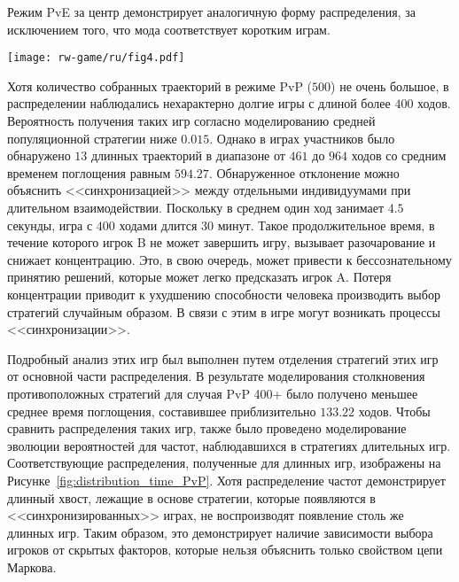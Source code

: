 Режим PvE за центр демонстрирует аналогичную форму распределения, за исключением того, что мода соответствует коротким играм.


\begin{figure*}[t]
    \centering
    \texttt{[image: rw-game/ru/fig4.pdf]}
    \caption{
        Распределение времени поглощения для режима PvP (желтая гистограмма и фиолетовая линия) по сравнению с моделированием частот направлений движения (зеленая линия) и частот стратегий (синяя линия), наблюдаемых в длительных играх (более $400$ ходов). Частоты направлений движения для каждого состояния, полученные в экспериментальных длинных играх, использовались для моделирования эволюции вероятностей найти фишку в узлах решетки. Стратегии обоих игроков A и B в PvP с длиной ходов более $400$ использовались отдельно при моделировании
    }  
    \label{fig:distribution_time_PvP}

\end{figure*}

Хотя количество собранных траекторий в режиме PvP ($500$) не очень большое, в распределении наблюдались нехарактерно долгие игры с длиной более $400$ ходов. Вероятность получения таких игр согласно моделированию средней популяционной стратегии ниже $0.015$. Однако в играх участников было обнаружено $13$ длинных траекторий в диапазоне от $461$ до $964$ ходов со средним временем поглощения равным $594.27$. Обнаруженное отклонение можно объяснить <<синхронизацией>> между отдельными индивидуумами при длительном взаимодействии. Поскольку в среднем один ход занимает $4.5$ секунды, игра с $400$ ходами длится $30$ минут. Такое продолжительное время, в течение которого игрок B не может завершить игру, вызывает разочарование и снижает концентрацию. Это, в свою очередь, может привести к бессознательному принятию решений, которые может легко предсказать игрок A. Потеря концентрации приводит к ухудшению способности человека производить выбор стратегий случайным образом. В связи с этим в игре могут возникать процессы <<синхронизации>>.

Подробный анализ этих игр был выполнен путем отделения стратегий этих игр от основной части распределения. В результате моделирования столкновения противоположных стратегий для случая PvP 400+ было получено меньшее среднее время поглощения, составившее приблизительно $133.22$ ходов. Чтобы сравнить распределения таких игр, также было проведено моделирование эволюции вероятностей для частот, наблюдавшихся в стратегиях длительных игр. Соответствующие распределения, полученные для длинных игр, изображены на Рисунке~\cref{fig:distribution_time_PvP}. Хотя распределение частот демонстрирует длинный хвост, лежащие в основе стратегии, которые появляются в <<синхронизированных>> играх, не воспроизводят появление столь же длинных игр. Таким образом, это демонстрирует наличие зависимости выбора игроков от скрытых факторов, которые нельзя объяснить только свойством цепи Маркова.

